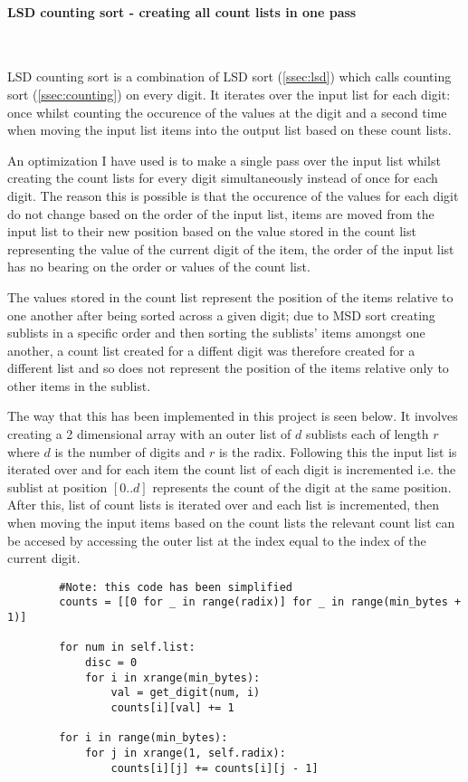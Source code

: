 \documentclass[12pt]{article}
\begin{document}
\paragraph{LSD counting sort - creating all count lists in one pass}\
\par
LSD counting sort is a combination of LSD sort (\ref{ssec:lsd}) which calls counting sort (\ref{ssec:counting}) on every digit. It iterates over the input list for each digit: once whilst counting the occurence of the values at the digit and a second time when moving the input list items into the output list based on these count lists.
\par
An optimization I have used is to make a single pass over the input list whilst creating the count lists for every digit simultaneously instead of once for each digit. The reason this is possible is that the occurence of the values for each digit do not change based on the order of the input list, items are moved from the input list to their new position based on the value stored in the count list representing the value of the current digit of the item, the order of the input list has no bearing on the order or values of the count list. 
\par
The values stored in the count list represent the position of the items relative to one another after being sorted across a given digit; due to MSD sort creating sublists in a specific order and then sorting the sublists' items amongst one another, a count list created for a diffent digit was therefore created for a different list and so does not represent the position of the items relative only to other items in the sublist.
\par
The way that this has been implemented in this project is seen below. It involves creating a 2 dimensional array with an outer list of $d$ sublists each of length $r$ where $d$ is the number of digits and $r$ is the radix. Following this the input list is iterated over and for each item the count list of each digit is incremented i.e. the sublist at position $[0..d]$ represents the count of the digit at the same position. After this, list of count lists is iterated over and each list is incremented, then when moving the input items based on the count lists the relevant count list can be accesed by accessing the outer list at the index equal to the index of the current digit.\par
	\begin{lstlisting}
		#Note: this code has been simplified
		counts = [[0 for _ in range(radix)] for _ in range(min_bytes + 1)]

		for num in self.list:
			disc = 0
			for i in xrange(min_bytes):
				val = get_digit(num, i)
				counts[i][val] += 1

		for i in range(min_bytes):
			for j in xrange(1, self.radix):
				counts[i][j] += counts[i][j - 1]
	\end{lstlisting}
\end{document}
